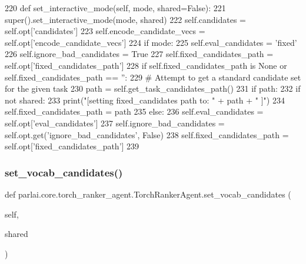 \begin{DoxyCode}
220     \textcolor{keyword}{def }set\_interactive\_mode(self, mode, shared=False):
221         super().set\_interactive\_mode(mode, shared)
222         self.candidates = self.opt[\textcolor{stringliteral}{'candidates'}]
223         self.encode\_candidate\_vecs = self.opt[\textcolor{stringliteral}{'encode\_candidate\_vecs'}]
224         \textcolor{keywordflow}{if} mode:
225             self.eval\_candidates = \textcolor{stringliteral}{'fixed'}
226             self.ignore\_bad\_candidates = \textcolor{keyword}{True}
227             self.fixed\_candidates\_path = self.opt[\textcolor{stringliteral}{'fixed\_candidates\_path'}]
228             \textcolor{keywordflow}{if} self.fixed\_candidates\_path \textcolor{keywordflow}{is} \textcolor{keywordtype}{None} \textcolor{keywordflow}{or} self.fixed\_candidates\_path == \textcolor{stringliteral}{''}:
229                 \textcolor{comment}{# Attempt to get a standard candidate set for the given task}
230                 path = self.get\_task\_candidates\_path()
231                 \textcolor{keywordflow}{if} path:
232                     \textcolor{keywordflow}{if} \textcolor{keywordflow}{not} shared:
233                         print(\textcolor{stringliteral}{"[setting fixed\_candidates path to: "} + path + \textcolor{stringliteral}{" ]"})
234                     self.fixed\_candidates\_path = path
235         \textcolor{keywordflow}{else}:
236             self.eval\_candidates = self.opt[\textcolor{stringliteral}{'eval\_candidates'}]
237             self.ignore\_bad\_candidates = self.opt.get(\textcolor{stringliteral}{'ignore\_bad\_candidates'}, \textcolor{keyword}{False})
238             self.fixed\_candidates\_path = self.opt[\textcolor{stringliteral}{'fixed\_candidates\_path'}]
239 
\end{DoxyCode}
\mbox{\label{classparlai_1_1core_1_1torch__ranker__agent_1_1TorchRankerAgent_a41c604613a97e566bfcc31667d0dfc6a}} 
\subsubsection{\texorpdfstring{set\+\_\+vocab\+\_\+candidates()}{set\_vocab\_candidates()}}
{\footnotesize\ttfamily def parlai.\+core.\+torch\+\_\+ranker\+\_\+agent.\+Torch\+Ranker\+Agent.\+set\+\_\+vocab\+\_\+candidates (\begin{DoxyParamCaption}\item[{}]{self,  }\item[{}]{shared }\end{DoxyParamCaption})}

